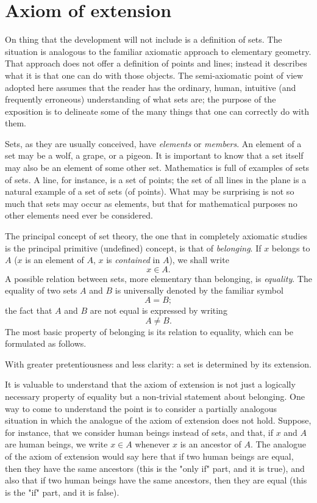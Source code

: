 \section{Axiom of extension}

On thing that the development will not include is a definition of sets. The situation is analogous to the familiar axiomatic approach to elementary geometry. That approach does not offer a definition of points and lines; instead it describes what it is that one can do with those objects. The semi-axiomatic point of view adopted here assumes that the reader has the ordinary, human, intuitive (and frequently erroneous) understanding of what sets are; the purpose of the exposition is to delineate some of the many things that one can correctly do with them.

Sets, as they are usually conceived, have \textit{elements} or \textit{members}. An element of a set may be a wolf, a grape, or a pigeon. It is important to know that a set itself may also be an element of some other set. Mathematics is full of examples of sets of sets. A line, for instance, is a set of points; the set of all lines in the plane is a natural example of a set of sets (of points). What may be surprising is not so much that sets may occur as elements, but that for mathematical purposes no other elements need ever be considered. 

The principal concept of set theory, the one that in completely axiomatic studies is the principal primitive (undefined) concept, is that of \textit{belonging}. If $x$ belongs to $A$ ($x$ is an element of $A$, $x$ is \textit{contained} in $A$), we shall write
\[
x \in A.
\]
A possible relation between sets, more elementary than belonging, is \textit{equality}. The equality of two sets $A$ and $B$ is universally denoted by the familiar symbol
\[
A = B;
\]
the fact that $A$ and $B$ are not equal is expressed by writing
\[
A \neq B.
\]
The most basic property of belonging is its relation to equality, which can be formulated as follows.


With greater pretentiousness and less clarity: a set is determined by its extension.

It is valuable to understand that the axiom of extension is not just a logically necessary property of equality but a non-trivial statement about belonging. One way to come to understand the point is to consider a partially analogous situation in which the analogue of the axiom of extension does not hold. Suppose, for instance, that we consider human beings instead of sets, and that, if $x$ and $A$ are human beings, we write $x \in A$ whenever $x$ is an ancestor of $A$. The analogue of the axiom of extension would say here that if two human beings are equal, then they have the same ancestors (this is the "only if" part, and it is true), and also that if two human beings have the same ancestors, then they are equal (this is the "if" part, and it is false).

